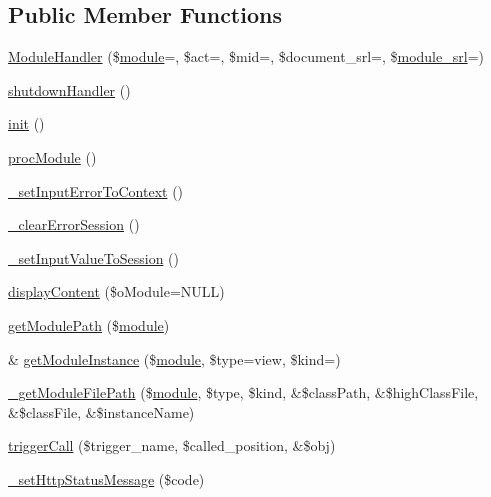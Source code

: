 \subsection*{Public Member Functions}
\begin{DoxyCompactItemize}
\item 
\hyperlink{classModuleHandler_acb0d9bc28180feb9c6023709147cdb08}{Module\+Handler} (\$\hyperlink{classmodule}{module}=\textquotesingle{}\textquotesingle{}, \$act=\textquotesingle{}\textquotesingle{}, \$mid=\textquotesingle{}\textquotesingle{}, \$document\+\_\+srl=\textquotesingle{}\textquotesingle{}, \$\hyperlink{ko_8install_8php_a370bb6450fab1da3e0ed9f484a38b761}{module\+\_\+srl}=\textquotesingle{}\textquotesingle{})
\item 
\hyperlink{classModuleHandler_a6295c502e315baa6c563f48ddf08e233}{shutdown\+Handler} ()
\item 
\hyperlink{classModuleHandler_a4a4671c196a893207c38af84c8ee7da8}{init} ()
\item 
\hyperlink{classModuleHandler_a74ad0ae3090eff1da5a6e0e68ce431d0}{proc\+Module} ()
\item 
\hyperlink{classModuleHandler_aa47d0ccb069d65698ade6f44bf6c705f}{\+\_\+set\+Input\+Error\+To\+Context} ()
\item 
\hyperlink{classModuleHandler_a45c91a72acccf3ee8139538ef5aa1c1d}{\+\_\+clear\+Error\+Session} ()
\item 
\hyperlink{classModuleHandler_ab3837506079a320e2726079777bb2b3e}{\+\_\+set\+Input\+Value\+To\+Session} ()
\item 
\hyperlink{classModuleHandler_a140c43faf30dedf139212294e3e9acf3}{display\+Content} (\$o\+Module=N\+U\+LL)
\item 
\hyperlink{classModuleHandler_a0a175bdc5034df0bf4ce66ea0e6e1bf2}{get\+Module\+Path} (\$\hyperlink{classmodule}{module})
\item 
\& \hyperlink{classModuleHandler_a453924aa8565875e953bfc9b8870fabb}{get\+Module\+Instance} (\$\hyperlink{classmodule}{module}, \$type=\textquotesingle{}view\textquotesingle{}, \$kind=\textquotesingle{}\textquotesingle{})
\item 
\hyperlink{classModuleHandler_a75e1eb90149d7f6e38cfd5dc7a9521d4}{\+\_\+get\+Module\+File\+Path} (\$\hyperlink{classmodule}{module}, \$type, \$kind, \&\$class\+Path, \&\$high\+Class\+File, \&\$class\+File, \&\$instance\+Name)
\item 
\hyperlink{classModuleHandler_aa1b1f9eae91ccd76e6a81c9375c2e673}{trigger\+Call} (\$trigger\+\_\+name, \$called\+\_\+position, \&\$obj)
\item 
\hyperlink{classModuleHandler_a91c14051caea99153975f2335a2dc770}{\+\_\+set\+Http\+Status\+Message} (\$code)
\end{DoxyCompactItemize}

